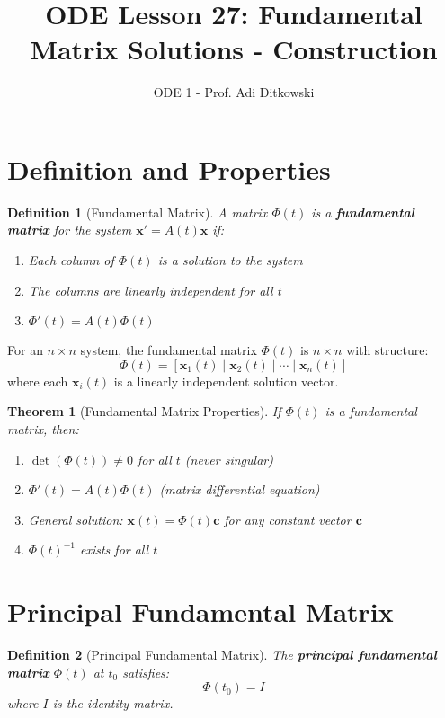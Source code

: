 \documentclass[12pt]{article}
\title{ODE Lesson 27: Fundamental Matrix Solutions - Construction}
\author{ODE 1 - Prof. Adi Ditkowski}
\date{}
\newtheorem{definition}{Definition}
\newtheorem{theorem}{Theorem}
\begin{document}
\maketitle

\section{Definition and Properties}

\begin{definition}[Fundamental Matrix]
A matrix $\Phi(t)$ is a \textbf{fundamental matrix} for the system $\mathbf{x}' = A(t)\mathbf{x}$ if:
\begin{enumerate}
\item Each column of $\Phi(t)$ is a solution to the system
\item The columns are linearly independent for all $t$
\item $\Phi'(t) = A(t)\Phi(t)$
\end{enumerate}
\end{definition}

\begin{keypoint}
For an $n \times n$ system, the fundamental matrix $\Phi(t)$ is $n \times n$ with structure:
$$\Phi(t) = [\mathbf{x}_{1}(t) \mid \mathbf{x}_{2}(t) \mid \cdots \mid \mathbf{x}_{n}(t)]$$
where each $\mathbf{x}_{i}(t)$ is a linearly independent solution vector.
\end{keypoint}

\begin{theorem}[Fundamental Matrix Properties]
If $\Phi(t)$ is a fundamental matrix, then:
\begin{enumerate}
\item $\det(\Phi(t)) \neq 0$ for all $t$ (never singular)
\item $\Phi'(t) = A(t)\Phi(t)$ (matrix differential equation)
\item General solution: $\mathbf{x}(t) = \Phi(t)\mathbf{c}$ for any constant vector $\mathbf{c}$
\item $\Phi(t)^{-1}$ exists for all $t$
\end{enumerate}
\end{theorem}

\section{Principal Fundamental Matrix}

\begin{definition}[Principal Fundamental Matrix]
The \textbf{principal fundamental matrix} $\Phi(t)$ at $t_{0}$ satisfies:
$$\Phi(t_{0}) = I$$
where $I$ is the identity matrix.
\end{definition}
\end{document}
